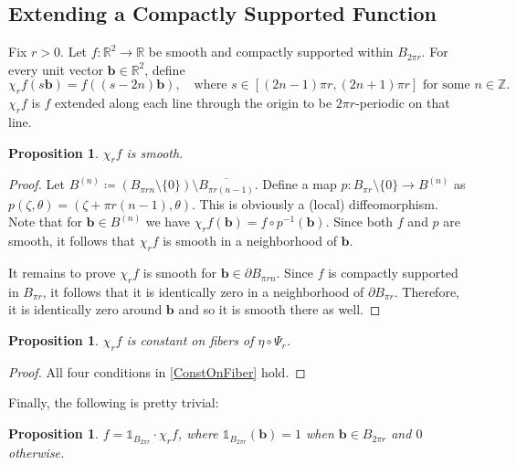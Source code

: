 \documentclass[a4paper,11pt]{scrartcl}
\newcounter{dummy}
\numberwithin{dummy}{section}
\theoremstyle{plain}
\newtheorem{proposition}[dummy]{Proposition}
\theoremstyle{plain}
\theoremstyle{plain}
\theoremstyle{plain}
\theoremstyle{nonumberplain}
\newtheorem{proof}{Proof}
\newcommand{\F}[1][R]{\mathbb{#1}} %
\begin{document}
	\subsection{Extending a Compactly Supported Function}
	Fix $ r > 0 $. Let $ f : \F^{2} \to \F $ be smooth and compactly supported within $ B_{2 \pi r} $. For every unit vector $ \mathbf{b} \in \F^{2} $, define
	\begin{equation*}
	\chi_{r} f (s \mathbf{b})
	= f ((s - 2n) \mathbf{b}), \quad
	\mbox{where }
	s \in [(2n-1) \pi r, (2n+1)\pi r] \mbox{ for some } n \in \F[Z].
	\end{equation*}
	$ \chi_{r} f $ is $ f $ extended along each line through the origin to be $ 2 \pi r $-periodic on that line.
	
	\begin{proposition}
		$ \chi_{r} f $ is smooth.
	\end{proposition}
	
	\begin{proof}
		Let $ B^{(n)} \coloneqq \left(B_{\pi r n}\setminus \{0\}\right) \setminus \overline{B_{\pi r (n-1)}}  $. 
		Define a map $ p : B_{\pi r}\setminus \{0\} \to B^{(n)} $ as $ p(\zeta, \theta) = \left( \zeta + \pi r (n-1), \theta\right) $. This is obviously a (local) diffeomorphism. Note that for $ \mathbf{b} \in B^{(n)} $ we have $ \chi_{r} f (\mathbf{b}) = f \circ p^{-1} (\mathbf{b}) $. Since both $ f $ and $ p $ are smooth, it follows that $ \chi_{r} f $ is smooth in a neighborhood of $ \mathbf{b} $.
		
		It remains to prove $ \chi_{r} f $ is smooth for $ \mathbf{b} \in \partial B_{\pi r n} $. Since $ f $ is compactly supported in $ B_{\pi r } $, it follows that it is identically zero in a neighborhood of $ \partial B_{\pi r} $. Therefore, it is identically zero around $ \mathbf{b} $ and so it is smooth there as well.
	\end{proof}
	
	\begin{proposition}
		$ \chi_{r} f $ is constant on fibers of $ \eta \circ \Psi_{r} $.
	\end{proposition}
	
	\begin{proof}
		All four conditions in \cref{ConstOnFiber} hold.
	\end{proof}
	
	Finally, the following is pretty trivial:
	\begin{proposition}
		$ f = \mathds{1}_{B_{2 \pi r}} \cdot \chi_{r} f $, where $ \mathds{1}_{B_{2 \pi r}} (\mathbf{b}) = 1 $ when $ \mathbf{b} \in B_{2\pi r} $ and $ 0 $ otherwise.
	\end{proposition}
	
\end{document}
